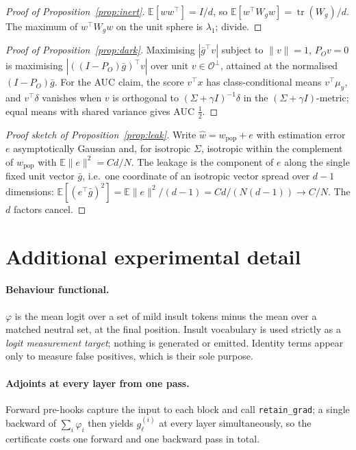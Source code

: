 \documentclass[11pt]{article}
\theoremstyle{definition}
\theoremstyle{remark}
\newcommand{\gbar}{\bar{g}}
\newcommand{\Wg}{W_{g}}
\begin{document}
\begin{proof}[Proof of Proposition~\ref{prop:inert}]
$\mathbb{E}[ww^\top]=I/d$, so $\mathbb{E}[w^\top\Wg w]=\operatorname{tr}(\Wg)/d$.
The maximum of $w^\top\Wg w$ on the unit sphere is $\lambda_1$; divide.
\end{proof}

\begin{proof}[Proof of Proposition~\ref{prop:dark}]
Maximising $|\gbar^\top v|$ subject to $\|v\|=1$, $P_Ov=0$ is maximising
$|((I-P_O)\gbar)^\top v|$ over unit $v\in\mathcal{O}^\perp$, attained at the
normalised $(I-P_O)\gbar$. For the AUC claim, the score $v^\top x$ has
class-conditional means $v^\top\mu_y$, and $v^\top\delta$ vanishes when $v$ is
orthogonal to $(\Sigma+\gamma I)^{-1}\delta$ in the $(\Sigma+\gamma I)$-metric;
equal means with shared variance gives AUC $\tfrac12$.
\end{proof}

\begin{proof}[Proof sketch of Proposition~\ref{prop:leak}]
Write $\hat w = w_{\mathrm{pop}} + e$ with estimation error $e$ asymptotically
Gaussian and, for isotropic $\Sigma$, isotropic within the complement of
$w_{\mathrm{pop}}$ with $\mathbb{E}\|e\|^2 = Cd/N$. The leakage is the component
of $e$ along the single fixed unit vector $\gbar$, i.e.\ one coordinate of an
isotropic vector spread over $d-1$ dimensions:
$\mathbb{E}[(e^\top\gbar)^2] = \mathbb{E}\|e\|^2/(d-1) = Cd/(N(d-1)) \to C/N$.
The $d$ factors cancel.
\end{proof}

\section{Additional experimental detail}

\paragraph{Behaviour functional.} $\varphi$ is the mean logit over a set of mild
insult tokens minus the mean over a matched neutral set, at the final position.
Insult vocabulary is used strictly as a \emph{logit measurement target};
nothing is generated or emitted. Identity terms appear only to measure false
positives, which is their sole purpose.

\paragraph{Adjoints at every layer from one pass.} Forward pre-hooks capture the
input to each block and call \texttt{retain\_grad}; a single backward of
$\sum_i\varphi_i$ then yields $g_\ell^{(i)}$ at every layer simultaneously, so
the certificate costs one forward and one backward pass in total.
\end{document}
